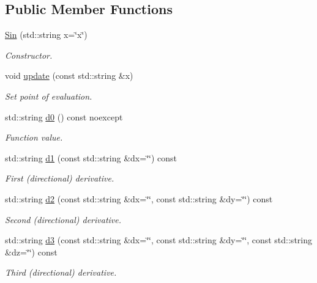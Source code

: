 \subsection*{Public Member Functions}
\begin{DoxyCompactItemize}
\item 
\hyperlink{structFunG_1_1stringify_1_1Sin_a75001ac11460a996c59a36ca9f7807ff}{Sin} (std\-::string x=\char`\"{}x\char`\"{})
\begin{DoxyCompactList}\small\item\em Constructor. \end{DoxyCompactList}\item 
void \hyperlink{structFunG_1_1stringify_1_1Sin_acc090c4fe89661177659b6ec8fe5fc00}{update} (const std\-::string \&x)
\begin{DoxyCompactList}\small\item\em Set point of evaluation. \end{DoxyCompactList}\item 
std\-::string \hyperlink{structFunG_1_1stringify_1_1Sin_a66e8e9920bd2ed18194a504eb4c9a282}{d0} () const noexcept
\begin{DoxyCompactList}\small\item\em Function value. \end{DoxyCompactList}\item 
std\-::string \hyperlink{structFunG_1_1stringify_1_1Sin_a2b41da1c15f98ddce386bf8e25892060}{d1} (const std\-::string \&dx=\char`\"{}\char`\"{}) const 
\begin{DoxyCompactList}\small\item\em First (directional) derivative. \end{DoxyCompactList}\item 
std\-::string \hyperlink{structFunG_1_1stringify_1_1Sin_acf3171027438cb0f93ffff03d6f436f7}{d2} (const std\-::string \&dx=\char`\"{}\char`\"{}, const std\-::string \&dy=\char`\"{}\char`\"{}) const 
\begin{DoxyCompactList}\small\item\em Second (directional) derivative. \end{DoxyCompactList}\item 
std\-::string \hyperlink{structFunG_1_1stringify_1_1Sin_a4fdcff4d7bfed0c474197ab9a51802c7}{d3} (const std\-::string \&dx=\char`\"{}\char`\"{}, const std\-::string \&dy=\char`\"{}\char`\"{}, const std\-::string \&dz=\char`\"{}\char`\"{}) const 
\begin{DoxyCompactList}\small\item\em Third (directional) derivative. \end{DoxyCompactList}\end{DoxyCompactItemize}


